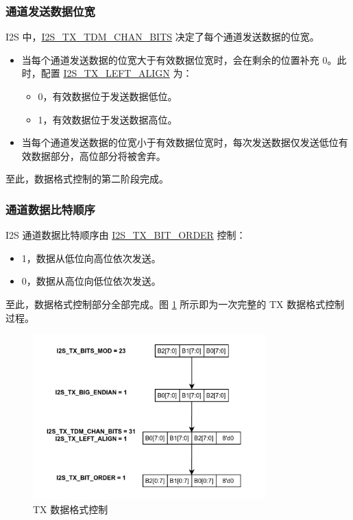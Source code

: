 \documentclass[main\_\_CN.tex]{subfiles}
\begin{document}
\subsubsection{通道发送数据位宽}
\chipname{} I2S 中，\hyperref[fielddesc:I2STXTDMCHANBITS]{I2S\_TX\_TDM\_CHAN\_BITS} 决定了每个通道发送数据的位宽。

\begin{itemize}
\item 当每个通道发送数据的位宽大于有效数据位宽时，会在剩余的位置补充 0。此时，配置 \hyperref[fielddesc:I2STXLEFTALIGN]{I2S\_TX\_LEFT\_ALIGN} 为：
\begin{itemize}
\item 0，有效数据位于发送数据低位。
\item 1，有效数据位于发送数据高位。
\end{itemize}
\item 当每个通道发送数据的位宽小于有效数据位宽时，每次发送数据仅发送低位有效数据部分，高位部分将被舍弃。
\end{itemize}
至此，数据格式控制的第二阶段完成。

\subsubsection{通道数据比特顺序}
\chipname{} I2S 通道数据比特顺序由 \hyperref[fielddesc:I2STXBITORDER]{I2S\_TX\_BIT\_ORDER} 控制：
\begin{itemize}
\item 1，数据从低位向高位依次发送。
\item 0，数据从高位向低位依次发送。
\end{itemize}
至此，数据格式控制部分全部完成。图 \ref{Figure:i2s_data_mode_control} 所示即为一次完整的 TX 数据格式控制过程。


\begin{figure}[H]
    \centering
    \includegraphics[width=0.8\textwidth]{03-I2S/figures/i2s_tx_data_config.png}
    \caption{TX 数据格式控制}
    \label{Figure:i2s_data_mode_control}
\end{figure}
\end{document}
